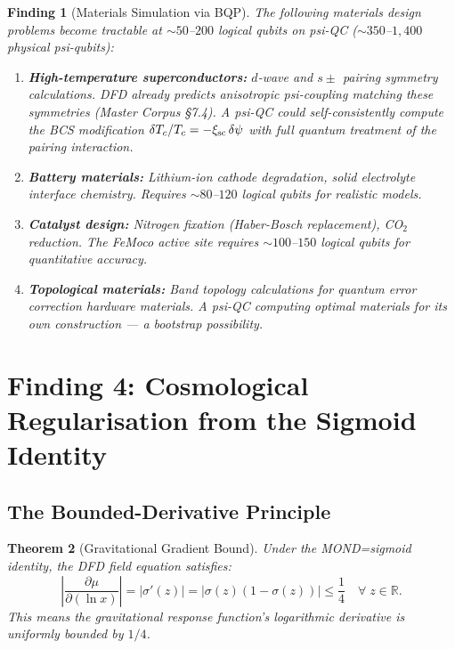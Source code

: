 \documentclass[11pt]{article}
\newtheorem{theorem}{Theorem}[section]
\newtheorem{finding}[theorem]{Finding}
\theoremstyle{definition}
\theoremstyle{remark}
\begin{document}
\begin{finding}[Materials Simulation via BQP]
\label{find:materials}
The following materials design problems become tractable at
$\sim 50$--$200$ logical qubits on psi-QC ($\sim 350$--$1{,}400$
physical psi-qubits):

\begin{enumerate}
\item \textbf{High-temperature superconductors:} $d$-wave and $s\pm$
  pairing symmetry calculations. DFD already predicts anisotropic
  psi-coupling matching these symmetries (Master Corpus \S7.4). A
  psi-QC could self-consistently compute the BCS modification
  $\delta T_c/T_c = -\xi_{\rm sc}\,\delta\psi$ with full quantum
  treatment of the pairing interaction.

\item \textbf{Battery materials:} Lithium-ion cathode degradation,
  solid electrolyte interface chemistry. Requires $\sim 80$--$120$
  logical qubits for realistic models.

\item \textbf{Catalyst design:} Nitrogen fixation (Haber-Bosch
  replacement), CO$_2$ reduction. The FeMoco active site requires
  $\sim 100$--$150$ logical qubits for quantitative accuracy.

\item \textbf{Topological materials:} Band topology calculations for
  quantum error correction hardware materials. A psi-QC computing
  optimal materials for its own construction --- a bootstrap possibility.
\end{enumerate}
\end{finding}

\section{Finding 4: Cosmological Regularisation from the Sigmoid Identity}
\label{sec:cosmo-regularisation}

\subsection{The Bounded-Derivative Principle}
\label{sec:bounded-derivative}

\begin{theorem}[Gravitational Gradient Bound]
\label{thm:grad-bound}
Under the MOND=sigmoid identity, the DFD field equation satisfies:
\begin{equation}
  \left|\frac{\partial \mu}{\partial(\ln x)}\right| =
  |\sigma'(z)| = |\sigma(z)(1 - \sigma(z))| \leq \frac{1}{4}
  \quad \forall\; z \in \mathbb{R}.
  \label{eq:grad-bound}
\end{equation}
This means the gravitational response function's logarithmic derivative
is uniformly bounded by $1/4$.
\end{theorem}
\end{document}
